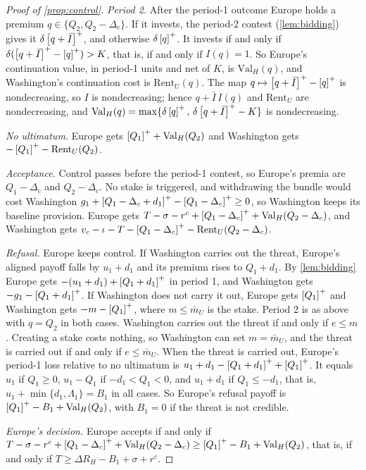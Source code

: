 \begin{proof}[Proof of \cref{prop:control}]
\emph{Period 2.} After the period-1 outcome Europe holds a premium $q\in\{Q_2,Q_2-\Delta_c\}$. If it invests, the period-2 contest (\cref{lem:bidding}) gives it $\delta\left[q+\bar I\right]^{+}$, and otherwise $\delta\left[q\right]^{+}$. It invests if and only if $\delta(\left[q+\bar I\right]^{+}-\left[q\right]^{+})>K$, that is, if and only if $I(q)=1$. So Europe's continuation value, in period-1 units and net of $K$, is $\mathrm{Val}_H(q)$, and Washington's continuation cost is $\mathrm{Rent}_U(q)$. The map $q\mapsto\left[q+\bar I\right]^{+}-\left[q\right]^{+}$ is nondecreasing, so $I$ is nondecreasing; hence $q+\bar I\,I(q)$ and $\mathrm{Rent}_U$ are nondecreasing, and $\mathrm{Val}_H(q)=\max\{\delta\left[q\right]^{+},\,\delta\left[q+\bar I\right]^{+}-K\}$ is nondecreasing.

\emph{No ultimatum.} Europe gets $\left[Q_1\right]^{+}+\mathrm{Val}_H(Q_2)$ and Washington gets $-\left[Q_1\right]^{+}-\mathrm{Rent}_U(Q_2)$.

\emph{Acceptance.} Control passes before the period-1 contest, so Europe's premia are $Q_1-\Delta_c$ and $Q_2-\Delta_c$. No stake is triggered, and withdrawing the bundle would cost Washington $g_1+\left[Q_1-\Delta_c+d_1\right]^{+}-\left[Q_1-\Delta_c\right]^{+}\ge 0$, so Washington keeps its baseline provision. Europe gets $T-\sigma-r^c+\left[Q_1-\Delta_c\right]^{+}+\mathrm{Val}_H(Q_2-\Delta_c)$, and Washington gets $v_c-\iota-T-\left[Q_1-\Delta_c\right]^{+}-\mathrm{Rent}_U(Q_2-\Delta_c)$.

\emph{Refusal.} Europe keeps control. If Washington carries out the threat, Europe's aligned payoff falls by $u_1+d_1$ and its premium rises to $Q_1+d_1$. By \cref{lem:bidding} Europe gets $-(u_1+d_1)+\left[Q_1+d_1\right]^{+}$ in period 1, and Washington gets $-g_1-\left[Q_1+d_1\right]^{+}$. If Washington does not carry it out, Europe gets $\left[Q_1\right]^{+}$ and Washington gets $-m-\left[Q_1\right]^{+}$, where $m\le\bar m_U$ is the stake. Period 2 is as above with $q=Q_2$ in both cases. Washington carries out the threat if and only if $e\le m$. Creating a stake costs nothing, so Washington can set $m=\bar m_U$, and the threat is carried out if and only if $e\le\bar m_U$. When the threat is carried out, Europe's period-1 loss relative to no ultimatum is $u_1+d_1-\left[Q_1+d_1\right]^{+}+\left[Q_1\right]^{+}$. It equals $u_1$ if $Q_1\ge 0$, $u_1-Q_1$ if $-d_1<Q_1<0$, and $u_1+d_1$ if $Q_1\le -d_1$, that is, $u_1+\min\{d_1,\Lambda_1\}=B_1$ in all cases. So Europe's refusal payoff is $\left[Q_1\right]^{+}-B_1+\mathrm{Val}_H(Q_2)$, with $B_1=0$ if the threat is not credible.

\emph{Europe's decision.} Europe accepts if and only if $T-\sigma-r^c+\left[Q_1-\Delta_c\right]^{+}+\mathrm{Val}_H(Q_2-\Delta_c)\ge\left[Q_1\right]^{+}-B_1+\mathrm{Val}_H(Q_2)$, that is, if and only if $T\ge\Delta R_H-B_1+\sigma+r^c$.


\end{proof}
